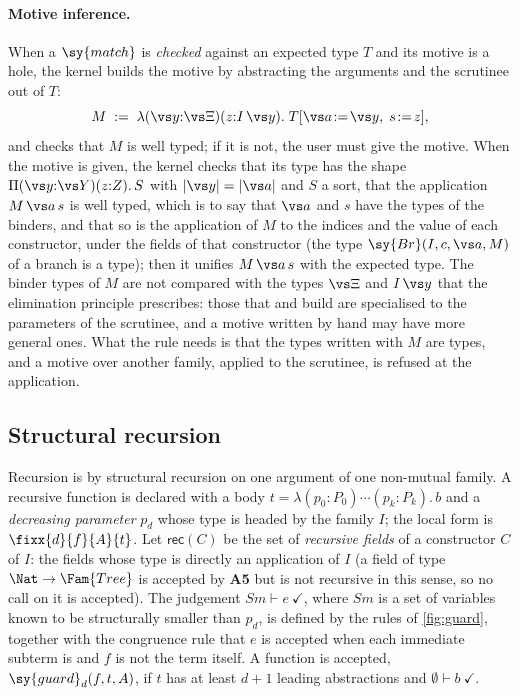 \paragraph{Motive inference.}
When a $\sy{match}$ is \emph{checked} against an expected type $T$ and its motive is a hole, the kernel builds the motive by abstracting the arguments and the scrutinee out of $T$:
\[
M \;:=\; \lambda(\vs y{:}\vs\Xi)(z{:}I\,\vs y).\;T[\vs a\!:=\!\vs y,\;s\!:=\!z],
\]
and checks that $M$ is well typed; if it is not, the user must give the motive.
When the motive is given, the kernel checks that its type has the shape $\Pi(\vs y{:}\vs Y)(z{:}Z).\,S$ with $|\vs y|=|\vs a|$ and $S$ a sort, that the application $M\,\vs a\,s$ is well typed, which is to say that $\vs a$ and $s$ have the types of the binders, and that so is the application of $M$ to the indices and the value of each constructor, under the fields of that constructor (the type $\sy{Br}(I,c,\vs a,M)$ of a branch is a type); then it unifies $M\,\vs a\,s$ with the expected type.
The binder types of $M$ are not compared with the types $\vs\Xi$ and $I\,\vs y$ that the elimination principle prescribes: those that  and  build are specialised to the parameters of the scrutinee, and a motive written by hand may have more general ones.
What the rule needs is that the types written with $M$ are types, and a motive over another family, applied to the scrutinee, is refused at the application.

\subsection{Structural recursion}\label{sec:guard}

Recursion is by structural recursion on one argument of one non-mutual family.
A recursive function is declared with a body $t=\lambda(p_0{:}P_0)\cdots(p_k{:}P_k).\,b$ and a \emph{decreasing parameter} $p_d$ whose type is headed by the family $I$; the local form is $\fixx{d}{f}{A}{t}$.
Let $\mathsf{rec}(C)$ be the set of \emph{recursive fields} of a constructor $C$ of $I$: the fields whose type is directly an application of $I$ (a field of type $\Nat\to\Fam{Tree}$ is accepted by \textbf{A5} but is not recursive in this sense, so no call on it is accepted).
The judgement $\mathit{Sm}\vdash e\ \checkmark$, where $\mathit{Sm}$ is a set of variables known to be structurally smaller than $p_d$, is defined by the rules of \cref{fig:guard}, together with the congruence rule that $e$ is accepted when each immediate subterm is and $f$ is not the term itself.
A function is accepted, $\sy{guard}_d(f,t,A)$, if $t$ has at least $d+1$ leading abstractions and $\emptyset\vdash b\ \checkmark$.

